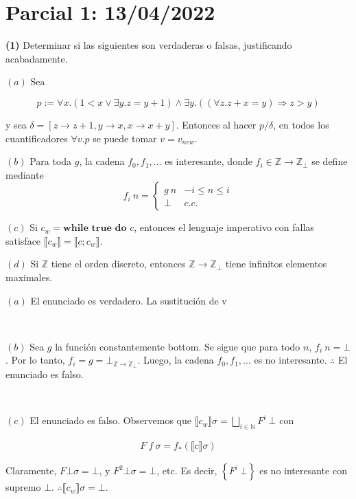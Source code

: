 \documentclass[a4paper, 12pt]{article}
\begin{document}
  
\section{Parcial 1: 13/04/2022}

\begin{myframe}
  \textbf{(1)} Determinar si las siguientes son verdaderas o falsas,
  justificando acabadamente. 

  $(a)$ Sea 

  $$p := \forall x . \left( 1 < x \lor \exists y. z = y + 1 \right) \land
  \exists y. \left( \left( \forall z. z+x =y \right)\Rightarrow z > y  \right)  $$

  y sea $\delta = [z \to z + 1, y \to x, x \to x + y]$. Entonces al hacer $p /
  \delta$, en todos los cuantificadores $\forall  v.p$ se puede tomar $v =
  v_{new}$.

  $(b)$ Para toda $g$, la cadena $f_0, f_1, \ldots$ es interesante, donde $f_i
\in \mathbb{Z} \to \mathbb{Z}_\bot $ se define mediante $$f_i ~ n = \begin{cases}
  g ~ n & -i \leq n \leq i \\ \bot  &c.c.
\end{cases}$$

$(c)$ Si $c_w = \textbf{while true} \textbf{ do } c$, entonces el lenguaje
imperativo con fallas satisface $\llbracket c_w \rrbracket = \llbracket c;c_w
\rrbracket$. 

$(d)$ Si $\mathbb{Z}$ tiene el orden discreto, entonces $\mathbb{Z} \to
\mathbb{Z}_\bot $ tiene infinitos elementos maximales.
\end{myframe}

$(a)$ El enunciado es verdadero. La sustitución de v

~

$(b)$ Sea $g$ la función constantemente bottom. Se sigue que para todo $n$, $f_i
~ n = \bot $. Por lo tanto, $f_i = g = \bot_{\mathbb{Z}\to \mathbb{Z}_\bot }$.
Luego, la cadena $f_0, f_1, \ldots$ es no interesante. $\therefore $ El
enunciado es falso.

~ 

$(c)$ El enunciado es falso. Observemos que $\llbracket c_w \rrbracket\sigma
= \bigsqcup_{i \in \mathbb{N}} F^i ~ \bot $ con 

\begin{align*}
  F ~ f ~ \sigma = f_* (\llbracket c \rrbracket \sigma)
\end{align*}

Claramente, $F \bot \sigma = \bot $, y $F^2 \bot  \sigma = \bot $, etc. Es
decir, $\left\{ F^i ~ \bot  \right\} $ es no interesante con supremo $\bot $.
$\therefore \llbracket c_w \rrbracket\sigma = \bot $.
\end{document}

